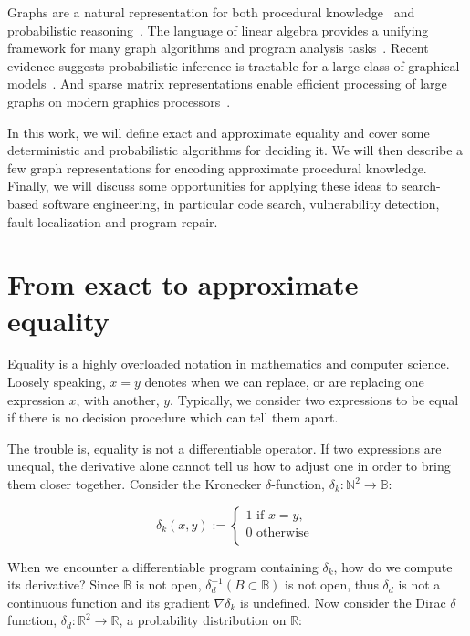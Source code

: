 \documentclass[11pt]{article}
\begin{document}
    Graphs are a natural representation for both procedural knowledge~\citep{allamanis2017learning} and probabilistic reasoning~\citep{pearl2014probabilistic}. The language of linear algebra provides a unifying framework for many graph algorithms and program analysis tasks~\citep{kepner2011graph}. Recent evidence suggests probabilistic inference is tractable for a large class of graphical models~\citep{choi2020probabilistic}. And sparse matrix representations enable efficient processing of large graphs on modern graphics processors~\citep{kepner2016mathematical}.

    In this work, we will define exact and approximate equality and cover some deterministic and probabilistic algorithms for deciding it. We will then describe a few graph representations for encoding approximate procedural knowledge. Finally, we will discuss some opportunities for applying these ideas to search-based software engineering, in particular code search, vulnerability detection, fault localization and program repair.


    \section{From exact to approximate equality}\label{sec:definitions}

    Equality is a highly overloaded notation in mathematics and computer science. Loosely speaking, $x = y$ denotes when we can replace, or are replacing one expression $x$, with another, $y$. Typically, we consider two expressions to be equal if there is no decision procedure which can tell them apart.

    The trouble is, equality is not a differentiable operator. If two expressions are unequal, the derivative alone cannot tell us how to adjust one in order to bring them closer together. Consider the Kronecker $\delta$-function, $\delta_k: \mathbb{N}^2\rightarrow \mathbb{B}$:

    $$
    \delta_k(x, y) :=
    \begin{cases}
        1 \text{ if } x = y, \\
        0 \text{ otherwise }\\
    \end{cases}
    $$

    When we encounter a differentiable program containing $\delta_k$, how do we compute its derivative? Since $\mathbb{B}$ is not open, $\delta_d^{-1}(B\subset \mathbb{B})$ is not open, thus $\delta_d$ is not a continuous function and its gradient $\nabla\delta_k$ is undefined. Now consider the Dirac $\delta$ function, $\delta_d: \mathbb{R}^2 \rightarrow \mathbb{R}$, a probability distribution on $\mathbb{R}$:
\end{document}
